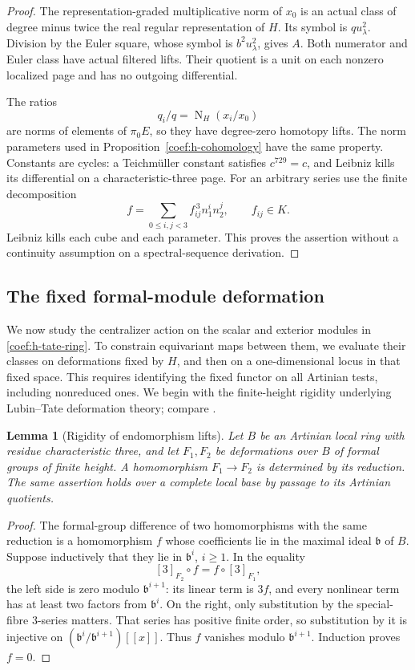 \documentclass[11pt]{article}
\newtheorem{lemma}[theorem]{Lemma}
\theoremstyle{definition}
\theoremstyle{remark}
\numberwithin{equation}{section}
\begin{document}
\begin{proof}
The representation-graded multiplicative norm of \(x_0\) is an actual
class of degree minus twice the real regular representation of \(H\).
Its symbol is \(q u_\lambda^2\).  Division by the Euler square,
whose symbol is \(b^2u_\lambda^2\), gives \(A\).  Both numerator and
Euler class have actual filtered lifts.  Their quotient is a unit
on each nonzero localized page and has no outgoing differential.

The ratios
\[
 q_i/q=\operatorname{N}_H(x_i/x_0)
\]
are norms of elements of \(\pi_0E\), so they have degree-zero
homotopy lifts.  The norm parameters used in
Proposition~\ref{coef:h-cohomology} have the same property.
Constants are cycles: a Teichm\"uller constant satisfies
\(c^{729}=c\), and Leibniz kills its differential on a
characteristic-three page.  For an arbitrary series use the finite
decomposition
\[
 f=\sum_{0\le i,j<3}f_{ij}^{\,3}n_1^i n_2^j,\qquad f_{ij}\in K.
\]
Leibniz kills each cube and each parameter.  This proves the assertion
without a continuity assumption on a spectral-sequence derivation.
\end{proof}

\subsection{The fixed formal-module deformation}

We now study the centralizer action on the scalar and exterior modules
in \eqref{coef:h-tate-ring}. To constrain equivariant maps between them,
we evaluate their classes on deformations fixed by \(H\), and then on a
one-dimensional locus in that fixed space. This requires identifying
the fixed functor on all Artinian tests, including nonreduced ones.
We begin with the finite-height rigidity underlying
Lubin--Tate deformation theory; compare
\cite[Proposition~2.4]{LubinTate}.

\begin{lemma}[Rigidity of endomorphism lifts]\label{coef:rigidity}
Let \(B\) be an Artinian local ring with residue characteristic three,
and let \(F_1,F_2\) be deformations over \(B\) of formal groups of
finite height.  A homomorphism \(F_1\to F_2\) is determined by its
reduction.  The same assertion holds over a complete local base by
passage to its Artinian quotients.
\end{lemma}

\begin{proof}
The formal-group difference of two homomorphisms with the same
reduction is a homomorphism \(f\) whose coefficients lie in the maximal
ideal \(\mathfrak b\) of \(B\).  Suppose inductively that they lie in
\(\mathfrak b^i\), \(i\ge1\).  In the equality
\[
 [3]_{F_2}\circ f=f\circ[3]_{F_1},
\]
the left side is zero modulo \(\mathfrak b^{i+1}\): its linear term
is \(3f\), and every nonlinear term has at least two factors from
\(\mathfrak b^i\).  On the right, only substitution by the
special-fibre 3-series matters.  That series has positive finite
order, so substitution by it is injective on
\((\mathfrak b^i/\mathfrak b^{i+1})[[x]]\).
Thus \(f\) vanishes modulo \(\mathfrak b^{i+1}\).
Induction proves \(f=0\).
\end{proof}
\end{document}
